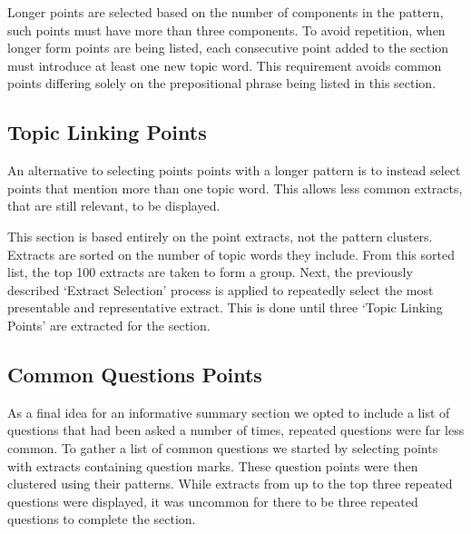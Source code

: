       Longer points are selected based on the number of components in the pattern, such points must have more than three components. To avoid repetition, when longer form points are being listed, each consecutive point added to the section must introduce at least one new topic word. This requirement avoids common points differing solely on the prepositional phrase being listed in this section.

    \subsection{Topic Linking Points}
      An alternative to selecting points points with a longer pattern is to instead select points that mention more than one topic word. This allows less common extracts, that are still relevant, to be displayed.

      This section is based entirely on the point extracts, not the pattern clusters. Extracts are sorted on the number of topic words they include. From this sorted list, the top 100 extracts are taken to form a group. Next, the previously described `Extract Selection' process is applied to repeatedly select the most presentable and representative extract. This is done until three `Topic Linking Points' are extracted for the section.

    \subsection{Common Questions Points}
      As a final idea for an informative summary section we opted to include a list of questions that had been asked a number of times, repeated questions were far less common. To gather a list of common questions we started by selecting points with extracts containing question marks. These question points were then clustered using their patterns. While extracts from up to the top three repeated questions were displayed, it was uncommon for there to be three repeated questions to complete the section.
